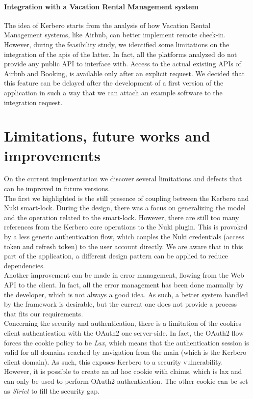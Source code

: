 \paragraph{Integration with a Vacation Rental Management system}
The idea of Kerbero starts from the analysis of how Vacation Rental Management systems, like \gls{Airbnb}, can better implement remote check-in. However, during the feasibility study, we identified some limitations on the integration of the \acrshort{api}s of the latter. In fact, all the platforms analyzed do not provide any public API to interface with. Access to the actual existing APIs of Airbnb and \gls{Booking}, is available only after an explicit request. We decided that this feature can be delayed after the development of a first version of the application in such a way that we can attach an example software to the integration request. 
 
\section{Limitations, future works and improvements}
On the current implementation we discover several limitations and defects that can be improved in future versions.
\\ The first we highlighted is the still presence of coupling between the Kerbero and Nuki smart-lock. During the design, there was a focus on generalizing the model and the operation related to the smart-lock. However, there are still too many references from the Kerbero core operations to the Nuki plugin. This is provoked by a less generic authentication flow, which couples the Nuki credentials (access token and refresh token) to the user account directly. We are aware that in this part of the application, a different design pattern can be applied to reduce dependencies.
\\ Another improvement can be made in error management, flowing from the Web API to the client. In fact, all the error management has been done manually by the developer, which is not always a good idea. As such, a better system handled by the framework is desirable, but the current one does not provide a process that fits our requirements. 
\\ Concerning the security and authentication, there is a limitation of the cookies client authentication with the OAuth2 one server-side. In fact, the OAuth2 flow forces the cookie policy to be \textit{Lax}, which means that the authentication session is valid for all domains reached by navigation from the main (which is the Kerbero client domain). As such, this exposes Kerbero to a security vulnerability. However, it is possible to create an ad hoc cookie with claims, which is lax and can only be used to perform OAuth2 authentication. The other cookie can be set as \textit{Strict} to fill the security gap. 
 
